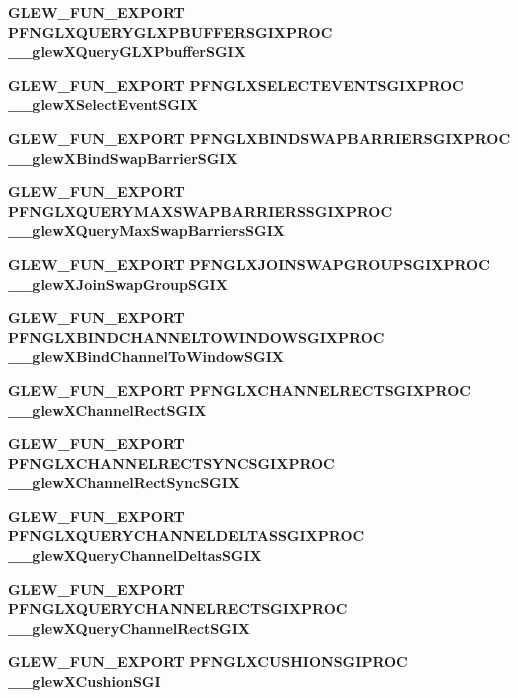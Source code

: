 \begin{DoxyCompactItemize}
{\bf G\+L\+E\+W\+\_\+\+F\+U\+N\+\_\+\+E\+X\+P\+O\+RT} {\bf P\+F\+N\+G\+L\+X\+Q\+U\+E\+R\+Y\+G\+L\+X\+P\+B\+U\+F\+F\+E\+R\+S\+G\+I\+X\+P\+R\+OC} {\bf \+\_\+\+\_\+glew\+X\+Query\+G\+L\+X\+Pbuffer\+S\+G\+IX}
\item 
{\bf G\+L\+E\+W\+\_\+\+F\+U\+N\+\_\+\+E\+X\+P\+O\+RT} {\bf P\+F\+N\+G\+L\+X\+S\+E\+L\+E\+C\+T\+E\+V\+E\+N\+T\+S\+G\+I\+X\+P\+R\+OC} {\bf \+\_\+\+\_\+glew\+X\+Select\+Event\+S\+G\+IX}
\item 
{\bf G\+L\+E\+W\+\_\+\+F\+U\+N\+\_\+\+E\+X\+P\+O\+RT} {\bf P\+F\+N\+G\+L\+X\+B\+I\+N\+D\+S\+W\+A\+P\+B\+A\+R\+R\+I\+E\+R\+S\+G\+I\+X\+P\+R\+OC} {\bf \+\_\+\+\_\+glew\+X\+Bind\+Swap\+Barrier\+S\+G\+IX}
\item 
{\bf G\+L\+E\+W\+\_\+\+F\+U\+N\+\_\+\+E\+X\+P\+O\+RT} {\bf P\+F\+N\+G\+L\+X\+Q\+U\+E\+R\+Y\+M\+A\+X\+S\+W\+A\+P\+B\+A\+R\+R\+I\+E\+R\+S\+S\+G\+I\+X\+P\+R\+OC} {\bf \+\_\+\+\_\+glew\+X\+Query\+Max\+Swap\+Barriers\+S\+G\+IX}
\item 
{\bf G\+L\+E\+W\+\_\+\+F\+U\+N\+\_\+\+E\+X\+P\+O\+RT} {\bf P\+F\+N\+G\+L\+X\+J\+O\+I\+N\+S\+W\+A\+P\+G\+R\+O\+U\+P\+S\+G\+I\+X\+P\+R\+OC} {\bf \+\_\+\+\_\+glew\+X\+Join\+Swap\+Group\+S\+G\+IX}
\item 
{\bf G\+L\+E\+W\+\_\+\+F\+U\+N\+\_\+\+E\+X\+P\+O\+RT} {\bf P\+F\+N\+G\+L\+X\+B\+I\+N\+D\+C\+H\+A\+N\+N\+E\+L\+T\+O\+W\+I\+N\+D\+O\+W\+S\+G\+I\+X\+P\+R\+OC} {\bf \+\_\+\+\_\+glew\+X\+Bind\+Channel\+To\+Window\+S\+G\+IX}
\item 
{\bf G\+L\+E\+W\+\_\+\+F\+U\+N\+\_\+\+E\+X\+P\+O\+RT} {\bf P\+F\+N\+G\+L\+X\+C\+H\+A\+N\+N\+E\+L\+R\+E\+C\+T\+S\+G\+I\+X\+P\+R\+OC} {\bf \+\_\+\+\_\+glew\+X\+Channel\+Rect\+S\+G\+IX}
\item 
{\bf G\+L\+E\+W\+\_\+\+F\+U\+N\+\_\+\+E\+X\+P\+O\+RT} {\bf P\+F\+N\+G\+L\+X\+C\+H\+A\+N\+N\+E\+L\+R\+E\+C\+T\+S\+Y\+N\+C\+S\+G\+I\+X\+P\+R\+OC} {\bf \+\_\+\+\_\+glew\+X\+Channel\+Rect\+Sync\+S\+G\+IX}
\item 
{\bf G\+L\+E\+W\+\_\+\+F\+U\+N\+\_\+\+E\+X\+P\+O\+RT} {\bf P\+F\+N\+G\+L\+X\+Q\+U\+E\+R\+Y\+C\+H\+A\+N\+N\+E\+L\+D\+E\+L\+T\+A\+S\+S\+G\+I\+X\+P\+R\+OC} {\bf \+\_\+\+\_\+glew\+X\+Query\+Channel\+Deltas\+S\+G\+IX}
\item 
{\bf G\+L\+E\+W\+\_\+\+F\+U\+N\+\_\+\+E\+X\+P\+O\+RT} {\bf P\+F\+N\+G\+L\+X\+Q\+U\+E\+R\+Y\+C\+H\+A\+N\+N\+E\+L\+R\+E\+C\+T\+S\+G\+I\+X\+P\+R\+OC} {\bf \+\_\+\+\_\+glew\+X\+Query\+Channel\+Rect\+S\+G\+IX}
\item 
{\bf G\+L\+E\+W\+\_\+\+F\+U\+N\+\_\+\+E\+X\+P\+O\+RT} {\bf P\+F\+N\+G\+L\+X\+C\+U\+S\+H\+I\+O\+N\+S\+G\+I\+P\+R\+OC} {\bf \+\_\+\+\_\+glew\+X\+Cushion\+S\+GI}

\end{DoxyCompactItemize}
